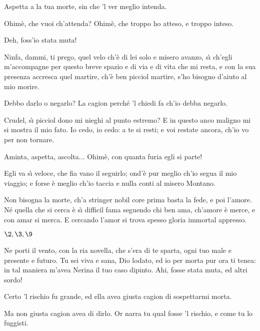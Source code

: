 \documentclass{book}
\begin{document}
	\2 Aspetta a la tua morte,
	sin che 'l ver meglio intenda.

	\4 Ohim\`e, che vuoi ch'attenda?
	Ohim\`e, che troppo ho atteso, e troppo inteso.

	\7 Deh, foss'io stata muta!

	\4 Ninfa, dammi, ti prego,
	quel velo ch'\`e di lei
	solo e misero avanzo,
	s\`{\i} ch'egli m'accompagne
	per questo breve spazio
	e di via e di vita che mi resta,
	e con la sua presenza
	accresca quel martire,
	ch'\`e ben picciol martire,
	s'ho bisogno d'aiuto al mio morire.

	\7 Debbo darlo o negarlo?
	La cagion perch\'e 'l chiedi
	fa ch'io debba negarlo.

	\4 Crudel, s\`{\i} picciol dono
	mi nieghi al punto estremo?
	E in questo anco maligno
	mi si mostra il mio fato. Io cedo, io cedo:
	a te si resti; e voi restate ancora,
	ch'io vo per non tornare.

	\2 Aminta, aspetta, ascolta...
	Ohim\`e, con quanta furia egli si parte!

	\7 Egli va s\`{\i} veloce,
	che fia vano il seguirlo; ond'\`e pur meglio
	ch'io segua il mio viaggio; e forse \`e meglio
	ch'io taccia e nulla conti
	al misero Montano.

	\9 Non bisogna la morte,
	ch'a stringer nobil core
	prima basta la fede, e poi l'amore.
	N\'e quella che si cerca
	\`e s\`{\i} difficil fama
	seguendo chi ben ama,
	ch'amore \`e merce, e con amar si merca.
	E cercando l'amor si trova spesso
	gloria immortal appresso.



\Atto

\Scena

\(\2, \3, \9\)

	\2 Ne porti il vento, con la ria novella,
	che s'era di te sparta, ogni tuo male
	e presente e futuro. Tu sei viva
	e sana, Dio lodato, ed io per morta
	pur ora ti tenea: in tal maniera
	m'avea Nerina il tuo caso dipinto.
	Ahi, fosse stata muta, ed altri sordo!

	\3 Certo 'l rischio fu grande, ed ella avea
	giusta cagion di sospettarmi morta.

	\2 Ma non giusta cagion avea di dirlo.
	Or narra tu qual fosse 'l rischio, e come
	tu lo fuggisti. \\
\end{document}
